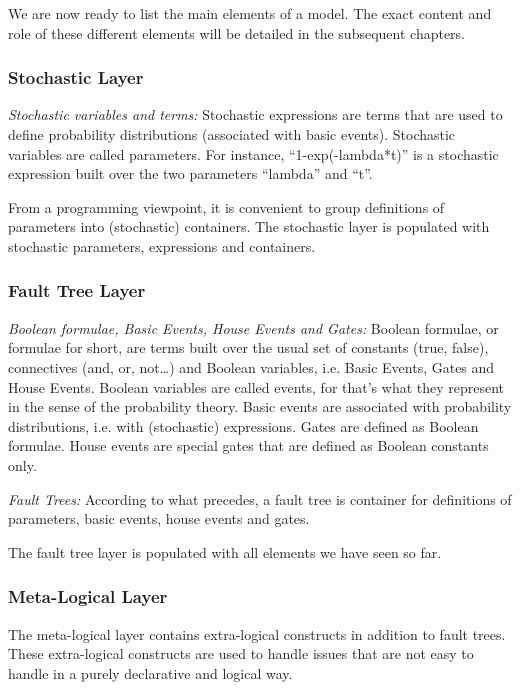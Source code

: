 \documentclass[11pt]{article}
\begin{document}
We are now ready to list the main elements of a model. The exact content
and role of these different elements will be detailed in the subsequent
chapters.

\subsubsection{Stochastic Layer}
\label{sec:org0dffb55}

\emph{Stochastic variables and terms:} Stochastic expressions are terms that
are used to define probability distributions (associated with basic
events). Stochastic variables are called parameters. For instance,
``1-exp(-lambda*t)'' is a stochastic expression built over the two
parameters ``lambda'' and ``t''.

From a programming viewpoint, it is convenient to group definitions of
parameters into (stochastic) containers. The stochastic layer is
populated with stochastic parameters, expressions and containers.

\subsubsection{Fault Tree Layer}
\label{sec:org702cd92}

\emph{Boolean formulae, Basic Events, House Events and Gates:} Boolean
formulae, or formulae for short, are terms built over the usual set of
constants (true, false), connectives (and, or, not\ldots{}) and Boolean
variables, i.e. Basic Events, Gates and House Events. Boolean variables
are called events, for that's what they represent in the sense of the
probability theory. Basic events are associated with probability
distributions, i.e. with (stochastic) expressions. Gates are defined as
Boolean formulae. House events are special gates that are defined as
Boolean constants only.

\emph{Fault Trees:} According to what precedes, a fault tree is container for
definitions of parameters, basic events, house events and gates.

The fault tree layer is populated with all elements we have seen so far.

\subsubsection{Meta-Logical Layer}
\label{sec:org6559b96}

The meta-logical layer contains extra-logical constructs in addition to
fault trees. These extra-logical constructs are used to handle issues
that are not easy to handle in a purely declarative and logical way.
\end{document}
